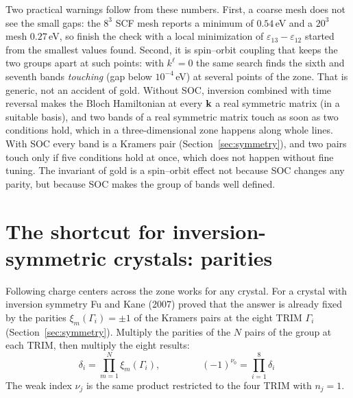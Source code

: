 Two practical warnings follow from these numbers. First, a coarse mesh
does not see the small gaps: the $8^3$ SCF mesh reports a minimum of
$0.54$\,eV and a $20^3$ mesh $0.27$\,eV, so finish the check with a local
minimization of $\varepsilon_{13}-\varepsilon_{12}$ started from the
smallest values found. Second, it is spin--orbit coupling that keeps the
two groups apart at such points: with $k^\ell = 0$ the same search finds
the sixth and seventh bands \emph{touching} (gap below $10^{-4}$\,eV) at
several points of the zone. That is generic, not an accident of gold.
Without SOC, inversion combined with time reversal makes the Bloch
Hamiltonian at every $\mathbf{k}$ a real symmetric matrix (in a suitable basis),
and two bands of a real symmetric matrix touch as soon as two conditions
hold, which in a three-dimensional zone happens along whole lines. With
SOC every band is a Kramers pair (Section~\ref{sec:symmetry}), and two
pairs touch only if five conditions hold at once, which does not happen
without fine tuning. The invariant of gold is a spin--orbit effect not because
SOC changes any parity, but because SOC makes the group of bands well
defined.

\section{The shortcut for inversion-symmetric crystals: parities}
\label{sec:fukane}

Following charge centers across the zone works for any crystal. For a
crystal with inversion symmetry Fu and Kane (2007) proved that the answer
is already fixed by the parities $\xi_m(\Gamma_i) = \pm1$ of the Kramers
pairs at the eight TRIM $\Gamma_i$ (Section~\ref{sec:symmetry}). Multiply
the parities of the $N$ pairs of the group at each TRIM, then multiply the
eight results:
\begin{equation}
\delta_i = \prod_{m=1}^{N} \xi_m(\Gamma_i) ,
\qquad\qquad
\boxed{\;(-1)^{\nu_0} = \prod_{i=1}^{8} \delta_i\;}
\label{eq:fukane}
\end{equation}
The weak index $\nu_j$ is the same product restricted to the four TRIM
with $n_j = 1$.

